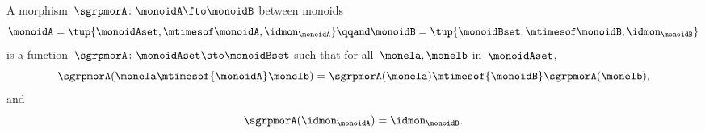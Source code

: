 \begin{ctdefinition}
    \label{def:monoid-mor}
    A morphism~$\sgrpmorA\colon \monoidA \fto \monoidB$ between monoids
    \begin{equation}
        \monoidA = \tup{\monoidAset, \mtimesof\monoidA, \idmon_\monoidA}
        \qqand
        \monoidB = \tup{\monoidBset, \mtimesof\monoidB, \idmon_\monoidB}
    \end{equation}
    is a function~$\sgrpmorA \colon \monoidAset \sto \monoidBset$ such that for all~$\monela, \monelb$ in~$\monoidAset$,
    \begin{equation}
        \label{eq:mon-mor-comp}
        \sgrpmorA (\monela \mtimesof{\monoidA} \monelb) = \sgrpmorA (\monela) \mtimesof{\monoidB}  \sgrpmorA(\monelb),
    \end{equation}
    and
    \begin{equation}
        \label{eq:mon-id-comp}
        \sgrpmorA (\idmon_\monoidA) = \idmon_{\monoidB}.
    \end{equation}
\end{ctdefinition}
